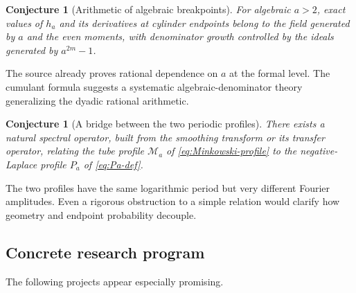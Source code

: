 \documentclass[11pt,oneside]{article}
\newtheorem{conjecture}[theorem]{Conjecture}
\theoremstyle{definition}
\theoremstyle{remark}
\begin{document}
\begin{conjecture}[Arithmetic of algebraic breakpoints]
For algebraic $a>2$, exact values of $h_a$ and its derivatives at cylinder endpoints belong
to the field generated by $a$ and the even moments, with denominator growth controlled by
the ideals generated by $a^{2m}-1$.
\end{conjecture}
The source already proves rational dependence on $a$ at the formal level.  The cumulant
formula suggests a systematic algebraic-denominator theory generalizing the dyadic rational
arithmetic.

\begin{conjecture}[A bridge between the two periodic profiles]
There exists a natural spectral operator, built from the smoothing transform or its transfer
operator, relating the tube profile $\mathcal M_a$ of \eqref{eq:Minkowski-profile} to the
negative-Laplace profile $P_a$ of \eqref{eq:Pa-def}.
\end{conjecture}
The two profiles have the same logarithmic period but very different Fourier amplitudes.
Even a rigorous obstruction to a simple relation would clarify how geometry and endpoint
probability decouple.

\subsection*{Concrete research program}

The following projects appear especially promising.
\end{document}
